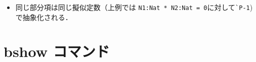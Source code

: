 \documentclass[a4paper,oneside,10pt,here]{memoir}
\begin{document}
\begin{itemize}
\begin{simplev}
((((N1 * N2) = 0) or ((N2 * N1) = 0)) implies ((N1 = 0) or (N2 = 0))):Bool
--> (((N2:Nat * N1:Nat) = 0) xor (true xor (((N1 = 0) and ((N2 = 0) and ((N1 * N2) = 0))) 
         xor (((N1 = 0) and ((N2 * N1) = 0)) xor ((N2 = 0) and ((N2 * N1) = 0))))))
** Abstracted boolean term:
  ((`P-1:Bool and `P-3:Bool) xor ((`P-1 and `P-2:Bool) xor ((`P-1 and (`P-3 and `P-2)) xor (`P-1 xor true))))
  where
    `P-1 = ((N2:Nat * N1:Nat) = 0)
    `P-2 = (N1:Nat = 0)
    `P-3 = (N2:Nat = 0)
\end{simplev}
\item 同じ部分項は同じ擬似定数（上例では \verb|N1:Nat * N2:Nat = 0|に対して\verb|`P-1|)で抽象化される．
\end{itemize}

\section{bshow コマンド}\label{sec:bshow}
\end{document}
